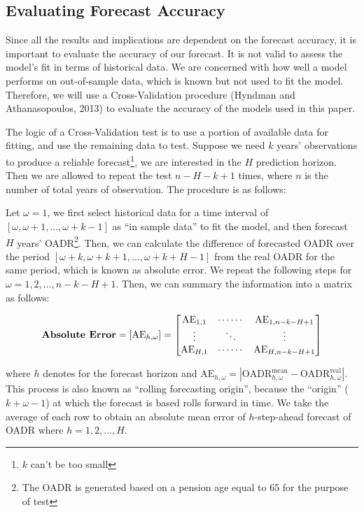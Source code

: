 \documentclass[11pt,a4paper,]{article}
\begin{document}
\subsection{Evaluating Forecast Accuracy}\label{sec:accuracy}

Since all the results and implications are dependent on the forecast
accuracy, it is important to evaluate the accuracy of our forecast. It
is not valid to assess the model's fit in terms of historical data. We
are concerned with how well a model performs on out-of-sample data,
which is known but not used to fit the model. Therefore, we will use a
Cross-Validation procedure (Hyndman and Athanasopoulos, 2013) to
evaluate the accuracy of the models used in this paper.

The logic of a Cross-Validation test is to use a portion of available
data for fitting, and use the remaining data to test. Suppose we need
\(k\) years' observations to produce a reliable
forecast\footnote{$k$ can't be too small}, we are interested in the
\(H\) prediction horizon. Then we are allowed to repeat the test
\(n-H-k+1\) times, where \(n\) is the number of total years of
observation. The procedure is as follows:

Let \(\omega=1\), we first select historical data for a time interval of
\([\omega,\omega+1,\dots,\omega+k-1]\) as ``in sample data'' to fit the
model, and then forecast \(H\) years'
OADR\footnote{The OADR is generated based on a pension age equal to 65 for the purpose of test}.
Then, we can calculate the difference of forecasted OADR over the period
\([\omega+k,\omega+k+1,\dots,\omega+k+H-1]\) from the real OADR for the
same period, which is known as absolute error. We repeat the following
steps for \(\omega=1,2,\dots,n-k-H+1\). Then, we can summary the
information into a matrix as follows:

\begin{equation*}
  \text{\textbf{Absolute Error}} = [\text{AE}_{h,\omega}] =
    \begin{bmatrix}
      \text{AE}_{1,1} & \cdots\cdots & \text{AE}_{1,n-k-H+1} \\
      \vdots          & \ddots       & \vdots \\
      \text{AE}_{H,1} & \cdots\cdots & \text{AE}_{H,n-k-H+1}
    \end{bmatrix}
\end{equation*}

where \(h\) denotes for the forecast horizon and
\(\text{AE}_{h,\omega}=\left|\text{OADR}^{\text{mean}}_{h,\omega}-\text{OADR}^{\text{real}}_{h,\omega}\right|\).
This process is also known as ``rolling forecasting origin'', because
the ``origin'' (\(k+\omega-1\)) at which the forecast is based rolls
forward in time. We take the average of each row to obtain an absolute
mean error of \(h\)-step-ahead forecast of OADR where \(h=1,2,\dots,H\).
\end{document}
